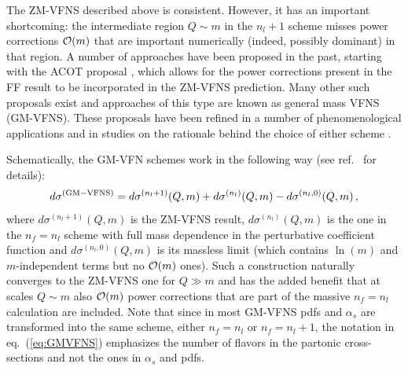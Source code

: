 \documentclass[letter,11pt]{article}
\def\as{\alpha_s}
\def\nf{{n_f}}
\def\nl{{n_l}}
\begin{document}
The ZM-VFNS described above is consistent. However, it has an important shortcoming: the intermediate region $Q\sim m$ in the $\nl+1$ scheme misses power corrections ${\cal O}(m)$ that are important numerically (indeed, possibly dominant) in that region. A number of approaches have been proposed in the past, starting with the ACOT proposal \cite{Aivazis:1993pi}, which allows for the power corrections present in the FF result to be incorporated in the ZM-VFNS prediction. Many other such proposals exist \cite{Thorne:1997ga,Thorne:1997uu,Kramer:2000hn,Thorne:2006qt,Tung:2006tb,Nadolsky:2009ge,Forte:2010ta,Guzzi:2011ew,Han:2014nja} and approaches of this type are known as general mass VFNS (GM-VFNS). These proposals have been refined in a number of phenomenological applications \cite{Cacciari:1998it,Forte:2015hba,Forte:2016sja,Olness:1987ep,Olness:1994zn,Bonvini:2015pxa,Bonvini:2016fgf} and in studies on the rationale behind the choice of either scheme \cite{Maltoni:2007tc,Maltoni:2012pa,Degrande:2015vpa,Lim:2016wjo}. 

Schematically, the GM-VFN schemes work in the following way (see ref.~\cite{Forte:2010ta} for details): 
%
\begin{equation}
d\sigma^{\rm (GM-VFNS)} = d\sigma^{(\nl+1)}(Q,m) + d\sigma^{(\nl)}(Q,m) - d\sigma^{(\nl,0)}(Q,m)\,,
\label{eq:GMVFNS}
\end{equation}
%
where $d\sigma^{(\nl+1)}(Q,m)$ is the ZM-VFNS result, $d\sigma^{(\nl)}(Q,m)$ is the one in the $\nf=\nl$ scheme with full mass dependence in the perturbative coefficient function and $d\sigma^{(\nl,0)}(Q,m)$ is its massless limit (which contains $\ln(m)$ and $m$-independent terms but no ${\cal O}(m)$ ones). Such a construction naturally converges to the ZM-VFNS one for $Q\gg m$ and has the added benefit that at scales $Q\sim m$ also ${\cal O}(m)$ power corrections that are part of the massive $\nf=\nl$ calculation are included. Note that since in most GM-VFNS pdfs and $\as$ are transformed into the same scheme, either $\nf=\nl$ or $\nf=\nl+1$, the notation in eq.~(\ref{eq:GMVFNS}) emphasizes the number of flavors in the partonic cross-sections and not the ones in $\as$ and pdfs.
\end{document}
